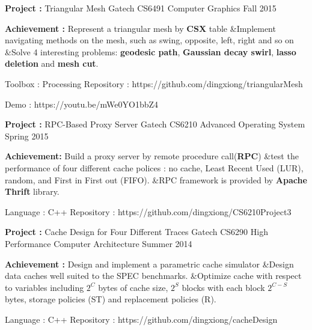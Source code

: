 


\begin{cventries}


\cvproject
{\textbf{Project :} Triangular Mesh} 
{Gatech CS6491 Computer Graphics} 
{Fall 2015}
{
  \begin{cvitems}
  \item {\textbf{Achievement :} Represent a triangular mesh by \textbf{CSX} table \quad\&\quad Implement navigating
      methods on the mesh, such as swing, opposite, left, right and so on
      \quad\&\quad  Solve 4 interesting problems: \textbf{geodesic path}, 
      \textbf{Gaussian decay swirl}, \textbf{lasso deletion} and \textbf{mesh cut}.}
  \item {Toolbox : Processing \quad
      Repository : {\color{black} https://github.com/dingxiong/triangularMesh}
    \item{
      Demo :   {\color{black} https://youtu.be/mWe0YO1bbZ4}}
  }
  \end{cvitems}
}

\cvproject
{\textbf{Project :} RPC-Based Proxy Server} 
{Gatech CS6210 Advanced Operating System} 
{Spring 2015} %
{
  \begin{cvitems}
  \item {\textbf{Achievement:} Build a proxy server by remote procedure call(\textbf{RPC}) 
\quad\&\quad test the performance of four different cache polices : no cache, Least Recent Used (LUR), random,
      and First in First out (FIFO). 
\quad\&\quad RPC framework is provided by \textbf{Apache Thrift} library.
    }
  \item {Language : C++  \quad
      Repository : {\color{black} https://github.com/dingxiong/CS6210Project3}
    }
  \end{cvitems}
}

\cvproject
{\textbf{Project :} Cache Design for Four Different Traces} 
{Gatech CS6290 High Performance Computer Architecture} 
{Summer 2014} %
{
  \begin{cvitems}
  \item {\textbf{Achievement :} Design and implement a parametric cache
      simulator \quad\&\quad Design data caches well suited to the SPEC benchmarks. 
      \quad\&\quad Optimize cache with respect to variables
      including $2^C$ bytes of cache size, $2^S$ blocks with each block $2^{C-S}$ bytes,
      storage policies (ST) and replacement policies (R).
    }
  \item {Language : C++  \quad
      Repository : {\color{black} https://github.com/dingxiong/cacheDesign}
    }
  \end{cvitems}
}


\end{cventries}
